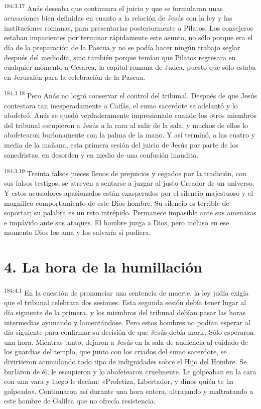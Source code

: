 \par 
\textsuperscript{184:3.17} Anás deseaba que continuara el juicio y que se formularan unas acusaciones bien definidas en cuanto a la relación de Jesús con la ley y las instituciones romanas, para presentarlas posteriormente a Pilatos. Los consejeros estaban impacientes por terminar rápidamente este asunto, no sólo porque era el día de la preparación de la Pascua y no se podía hacer ningún trabajo seglar después del mediodía, sino también porque temían que Pilatos regresara en cualquier momento a Cesarea, la capital romana de Judea, puesto que sólo estaba en Jerusalén para la celebración de la Pascua.

\par 
\textsuperscript{184:3.18} Pero Anás no logró conservar el control del tribunal. Después de que Jesús contestara tan inesperadamente a Caifás, el sumo sacerdote se adelantó y lo abofeteó. Anás se quedó verdaderamente impresionado cuando los otros miembros del tribunal escupieron a Jesús a la cara al salir de la sala, y muchos de ellos lo abofetearon burlonamente con la palma de la mano. Y así terminó, a las cuatro y media de la mañana, esta primera sesión del juicio de Jesús por parte de los sanedristas, en desorden y en medio de una confusión inaudita.

\par 
\textsuperscript{184:3.19} Treinta falsos jueces llenos de prejuicios y cegados por la tradición, con sus falsos testigos, se atreven a sentarse a juzgar al justo Creador de un universo. Y estos acusadores apasionados están exasperados por el silencio majestuoso y el magnífico comportamiento de este Dios-hombre. Su silencio es terrible de soportar; su palabra es un reto intrépido. Permanece impasible ante sus amenazas e impávido ante sus ataques. El hombre juzga a Dios, pero incluso en ese momento Dios los ama y los salvaría si pudiera.

\section*{4. La hora de la humillación}
\par 
\textsuperscript{184:4.1} En la cuestión de pronunciar una sentencia de muerte, la ley judía exigía que el tribunal celebrara dos sesiones. Esta segunda sesión debía tener lugar al día siguiente de la primera, y los miembros del tribunal debían pasar las horas intermedias ayunando y lamentándose. Pero estos hombres no podían esperar al día siguiente para confirmar su decisión de que Jesús debía morir. Sólo esperaron una hora. Mientras tanto, dejaron a Jesús en la sala de audiencia al cuidado de los guardias del templo, que junto con los criados del sumo sacerdote, se divirtieron acumulando todo tipo de indignidades sobre el Hijo del Hombre. Se burlaron de él, le escupieron y lo abofetearon cruelmente. Le golpeaban en la cara con una vara y luego le decían: «Profetiza, Libertador, y dinos quién te ha golpeado». Continuaron así durante una hora entera, ultrajando y maltratando a este hombre de Galilea que no ofrecía resistencia.

